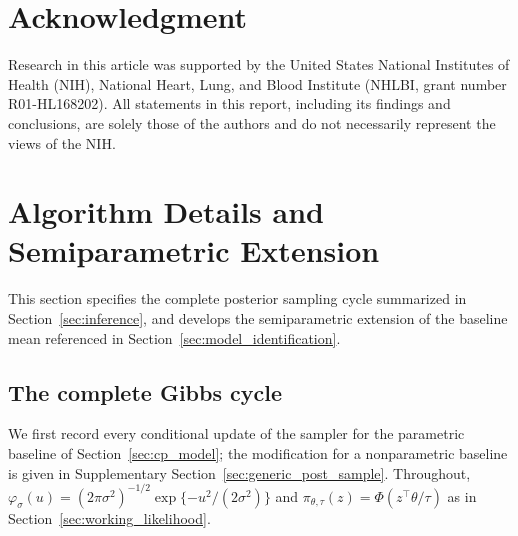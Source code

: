 \documentclass[11pt]{article}
\theoremstyle{definition}
\theoremstyle{plain}
\begin{document}
\section*{Acknowledgment}
Research in this article was supported by the United States National Institutes of Health (NIH), National Heart, Lung, and Blood Institute (NHLBI, grant number R01-HL168202). All statements in this report, including its findings and conclusions, are solely those of the authors and do not necessarily represent the views of the NIH.





\newpage
\appendix
\setcounter{page}{1}
\setcounter{section}{0}
\renewcommand{\thesection}{S\arabic{section}}
\renewcommand{\theequation}{S\arabic{equation}}
\renewcommand{\thefigure}{S\arabic{figure}}
\renewcommand{\thetable}{S\arabic{table}}
\renewcommand{\thetheorem}{S\arabic{theorem}}
\renewcommand{\thelemma}{S\arabic{lemma}}
\renewcommand{\thecorollary}{S\arabic{corollary}}
\renewcommand{\theproposition}{S\arabic{proposition}}
\renewcommand{\theassumption}{S\arabic{assumption}}
\renewcommand{\thedefinition}{S\arabic{definition}}
\renewcommand{\theremark}{S\arabic{remark}}
\renewcommand{\theexample}{S\arabic{example}}
\renewcommand{\appendixname}{Supplementary Material}


\section{Algorithm Details and Semiparametric Extension}
\label{sec:semiparametric_extension_details}

This section specifies the complete posterior sampling cycle summarized in Section~\ref{sec:inference}, and develops the semiparametric extension of the baseline mean referenced in Section~\ref{sec:model_identification}.

\subsection{The complete Gibbs cycle}
\label{sec:algorithm_details}

We first record every conditional update of the sampler for the parametric baseline of Section~\ref{sec:cp_model}; the modification for a nonparametric baseline is given in Supplementary Section~\ref{sec:generic_post_sample}. Throughout, $\varphi_\sigma(u)=(2\pi\sigma^2)^{-1/2}\exp\{-u^2/(2\sigma^2)\}$ and $\pi_{\theta,\tau}(z)=\Phi(z^\top\theta/\tau)$ as in Section~\ref{sec:working_likelihood}.
\end{document}
